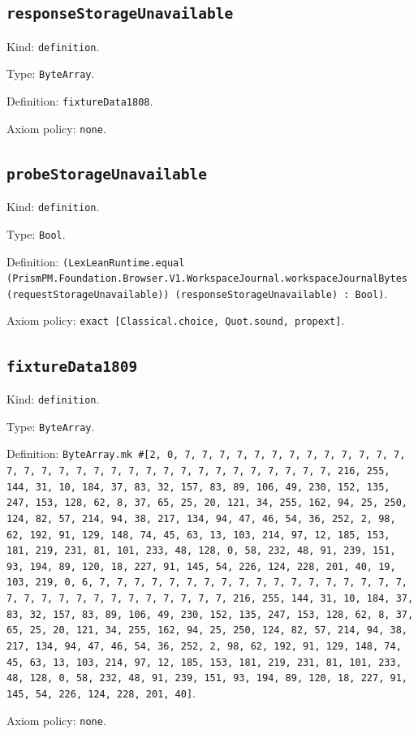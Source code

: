 \documentclass[11pt]{article}
\begin{document}
\subsection*{\texttt{responseStorageUnavailable}}
\noindent Kind: \texttt{definition}.\par
\noindent Type: \texttt{ByteArray}.\par
\noindent Definition: \texttt{fixtureData1808}.\par
\noindent Axiom policy: \texttt{none}.\par
\subsection*{\texttt{probeStorageUnavailable}}
\noindent Kind: \texttt{definition}.\par
\noindent Type: \texttt{Bool}.\par
\noindent Definition: \texttt{(LexLeanRuntime.equal (PrismPM.Foundation.Browser.V1.WorkspaceJournal.workspaceJournalBytes (requestStorageUnavailable)) (responseStorageUnavailable) : Bool)}.\par
\noindent Axiom policy: \texttt{exact [Classical.choice, Quot.sound, propext]}.\par
\subsection*{\texttt{fixtureData1809}}
\noindent Kind: \texttt{definition}.\par
\noindent Type: \texttt{ByteArray}.\par
\noindent Definition: \texttt{ByteArray.mk \#[2, 0, 7, 7, 7, 7, 7, 7, 7, 7, 7, 7, 7, 7, 7, 7, 7, 7, 7, 7, 7, 7, 7, 7, 7, 7, 7, 7, 7, 7, 7, 7, 7, 7, 216, 255, 144, 31, 10, 184, 37, 83, 32, 157, 83, 89, 106, 49, 230, 152, 135, 247, 153, 128, 62, 8, 37, 65, 25, 20, 121, 34, 255, 162, 94, 25, 250, 124, 82, 57, 214, 94, 38, 217, 134, 94, 47, 46, 54, 36, 252, 2, 98, 62, 192, 91, 129, 148, 74, 45, 63, 13, 103, 214, 97, 12, 185, 153, 181, 219, 231, 81, 101, 233, 48, 128, 0, 58, 232, 48, 91, 239, 151, 93, 194, 89, 120, 18, 227, 91, 145, 54, 226, 124, 228, 201, 40, 19, 103, 219, 0, 6, 7, 7, 7, 7, 7, 7, 7, 7, 7, 7, 7, 7, 7, 7, 7, 7, 7, 7, 7, 7, 7, 7, 7, 7, 7, 7, 7, 7, 7, 7, 7, 216, 255, 144, 31, 10, 184, 37, 83, 32, 157, 83, 89, 106, 49, 230, 152, 135, 247, 153, 128, 62, 8, 37, 65, 25, 20, 121, 34, 255, 162, 94, 25, 250, 124, 82, 57, 214, 94, 38, 217, 134, 94, 47, 46, 54, 36, 252, 2, 98, 62, 192, 91, 129, 148, 74, 45, 63, 13, 103, 214, 97, 12, 185, 153, 181, 219, 231, 81, 101, 233, 48, 128, 0, 58, 232, 48, 91, 239, 151, 93, 194, 89, 120, 18, 227, 91, 145, 54, 226, 124, 228, 201, 40]}.\par
\noindent Axiom policy: \texttt{none}.\par
\end{document}
